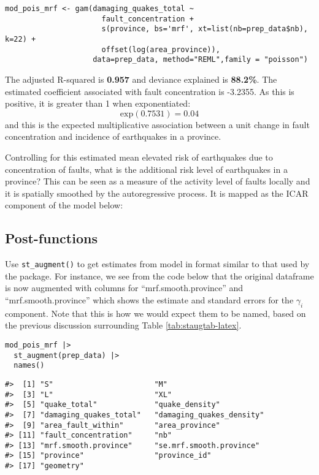 \begin{verbatim}
mod_pois_mrf <- gam(damaging_quakes_total ~ 
                      fault_concentration +
                      s(province, bs='mrf', xt=list(nb=prep_data$nb), k=22) +
                      offset(log(area_province)),
                    data=prep_data, method="REML",family = "poisson")
\end{verbatim}

The adjusted R-squared is \textbf{0.957} and deviance explained is \textbf{88.2\%}. The estimated coefficient associated with fault concentration is
-3.2355. As this is positive, it is greater than 1 when exponentiated:
\[
\text{exp}(0.7531) = 0.04
\]
and this is the expected multiplicative association between a unit
change in fault concentration and incidence of earthquakes in a
province.

Controlling for this estimated mean elevated risk of earthquakes due to
concentration of faults, what is the additional risk level of
earthquakes in a province? This can be seen as a measure of the activity
level of faults locally and it is spatially smoothed by the
autoregressive process. It is mapped as the ICAR component of the model
below:

\hypertarget{post-functions-1}{%
\subsection{Post-functions}\label{post-functions-1}}

Use \texttt{st\_augment()} to get estimates from  model in format
similar to that used by the  package. For instance, we see from the code below that the original dataframe is now augmented with columns for ``mrf.smooth.province'' and ``mrf.smooth.province'' which shows the estimate and standard errors for the \(\gamma_i\) component. Note that this is how we would expect them to be named, based on the previous discussion surrounding Table \ref{tab:staugtab-latex}.

\begin{verbatim}
mod_pois_mrf |> 
  st_augment(prep_data) |> 
  names()
\end{verbatim}

\begin{verbatim}
#>  [1] "S"                       "M"                      
#>  [3] "L"                       "XL"                     
#>  [5] "quake_total"             "quake_density"          
#>  [7] "damaging_quakes_total"   "damaging_quakes_density"
#>  [9] "area_fault_within"       "area_province"          
#> [11] "fault_concentration"     "nb"                     
#> [13] "mrf.smooth.province"     "se.mrf.smooth.province" 
#> [15] "province"                "province_id"            
#> [17] "geometry"
\end{verbatim}

